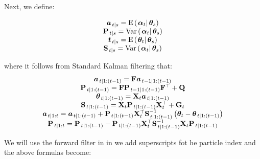 Next, we define:

\begin{equation}
\begin{matrix}
\KF{\vec{a}}{t}{s} = \expecC{\vec{\alpha}_t}{\vec{\theta}_{s}} \\
\KF{\mat{P}}{t}{s} = \varpC{\vec{\alpha}_t}{\vec{\theta}_{s}} \\
%
\KF{\vec{t}}{t}{s} = \expecC{\vec{\theta}_t}{\vec{\theta}_{s}} \\
\KF{\mat{S}}{t}{s} = \varpC{\vec{\alpha}_t}{\vec{\theta}_{s}}
\end{matrix}
\end{equation}

where it follows from Standard Kalman filtering that: 
\begin{equation}
\begin{matrix}
\KF{\vec{a}}{t}{1:(t - 1)} = \mat{F}\KF{\vec{a}}{t - 1}{1:(t - 1)} \\
\KF{\mat{P}}{t}{1:(t - 1)} = \mat{F}\KF{\mat{P}}{t - 1}{1:(t - 1)}\mat{F}^\top + \mat{Q} \\
\KF{\vec{\theta}}{t}{1:(t - 1)} = \mat{X}_t \KF{\vec{a}}{t}{1:(t - 1)} \\
\KF{\mat{S}}{t}{1:(t - 1)} = \mat{X}_t \KF{\mat{P}}{t}{1:(t - 1)} \mat{X}_t^\top + \mat{G}_t \\
%
\KF{\vec{a}}{t}{1:t} = \KF{\vec{a}}{t}{1:(t - 1)} + \KF{\mat{P}}{t}{1:(t - 1)} \mat{X}_t^\top %
	\KF{\mat{S}}{t}{1:(t - 1)}^{-1}\Lparen{ \vec{\theta}_t - \KF{\vec{\theta}}{t}{1:(t - 1)} } \\
\KF{\mat{P}}{t}{1:t} = \KF{\mat{P}}{t}{1:(t - 1)} - \KF{\mat{P}}{t}{1:(t - 1)} \mat{X}_t^\top \KF{\mat{S}}{t}{1:(t - 1)}^{-1} %
	\mat{X}_t\KF{\mat{P}}{t}{1:(t - 1)}
\end{matrix}
\end{equation}

We will use the forward filter in \cite{andrieu02} in we add superscripts fot he particle index and the above formulas become:
\fi

\newpage



 